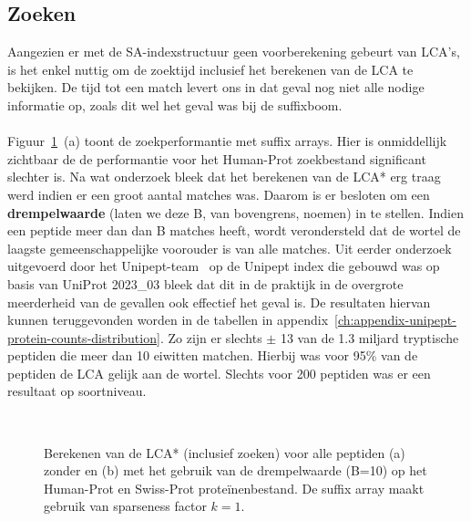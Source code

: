 \subsection{Zoeken}\label{subsec:zoeken}
Aangezien er met de SA-indexstructuur geen voorberekening gebeurt van LCA's, is het enkel nuttig om de zoektijd inclusief het berekenen van de LCA te bekijken.
De tijd tot een match levert ons in dat geval nog niet alle nodige informatie op, zoals dit wel het geval was bij de suffixboom.
\\ \\
Figuur~\ref{fig:cutoff_humanprot}~(a) toont de zoekperformantie met suffix arrays.
Hier is onmiddellijk zichtbaar de de performantie voor het Human-Prot zoekbestand significant slechter is.
Na wat onderzoek bleek dat het berekenen van de LCA* erg traag werd indien er een groot aantal matches was.
Daarom is er besloten om een \textbf{drempelwaarde} (laten we deze B, van bovengrens, noemen) in te stellen.
Indien een peptide meer dan dan B matches heeft, wordt verondersteld dat de wortel de laagste gemeenschappelijke voorouder is van alle matches.
Uit eerder onderzoek uitgevoerd door het Unipept-team~\cite{unipept_cutoff} op de Unipept index die gebouwd was op basis van UniProt 2023\_03 bleek dat dit in de praktijk in de overgrote meerderheid van de gevallen ook effectief het geval is.
De resultaten hiervan kunnen teruggevonden worden in de tabellen in appendix~\ref{ch:appendix-unipept-protein-counts-distribution}.
Zo zijn er slechts $\pm$ 13 van de 1.3 miljard tryptische peptiden die meer dan 10 eiwitten matchen.
Hierbij was voor 95\% van de peptiden de LCA gelijk aan de wortel.
Slechts voor 200 peptiden was er een resultaat op soortniveau.
\\
\begin{figure}[H]
    \centering
    \\[4ex] %

    \caption{Berekenen van de LCA* (inclusief zoeken) voor alle peptiden (a) zonder en (b) met het gebruik van de drempelwaarde (B=10) op het Human-Prot en Swiss-Prot proteïnenbestand. De suffix array maakt gebruik van sparseness factor $k = 1$.}\label{fig:cutoff_humanprot}
\end{figure}

